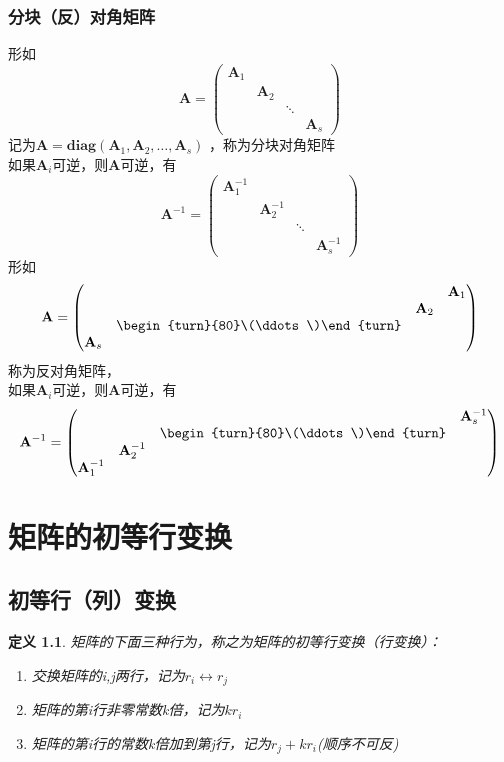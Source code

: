 \documentclass[12pt,oneside]{ctexbook}
\newtheorem{definition}[subsection]{定义}
\begin{document}
\subsection{分块（反）对角矩阵}
形如\[\mathbf{A}=\begin{pmatrix}
    \mathbf{A}_1&
    \\ &\mathbf{A}_2
    \\ &&\ddots
    \\ &&&\mathbf{A}_s
\end{pmatrix}\]
记为\(\mathbf{A}= \mathbf{diag}(\mathbf{A}_{1},\mathbf{A}_{2},\dots ,\mathbf{A}_{s})\)
，称为分块对角矩阵
\\如果\(\mathbf{A}_{i}\)可逆，则\(\mathbf{A}\)可逆，有\[\mathbf{A}^{-1}=\begin{pmatrix}
    \mathbf{A}^{-1}_1&
    \\ &\mathbf{A}^{-1}_2
    \\ &&\ddots
    \\ &&&\mathbf{A}^{-1}_s
\end{pmatrix}\]
形如\[\mathbf{A}=\begin{pmatrix}
    &&&\mathbf{A}_1
    \\ &&\mathbf{A}_2
    \\ &\begin{turn}{80}\(\ddots\)\end{turn}
    \\ \mathbf{A}_s
\end{pmatrix}\]
称为反对角矩阵，
\\如果\(\mathbf{A}_{i}\)可逆，则\(\mathbf{A}\)可逆，有
\[\mathbf{A}^{-1}=\begin{pmatrix}
    &&&\mathbf{A}^{-1}_s
    \\ &&\begin{turn}{80}\(\ddots\)\end{turn}
    \\ &\mathbf{A}^{-1}_2
    \\ \mathbf{A}^{-1}_1
\end{pmatrix}\]


\chapter{矩阵的初等行变换}
\section{初等行（列）变换}
\begin{definition}
    \kaishu 矩阵的下面三种行为，称之为矩阵的初等行变换（行变换）：
\begin{enumerate}
    \item 交换矩阵的i,j两行，记为\(r_i \leftrightarrow r_j \)
    \item 矩阵的第i行非零常数k倍，记为\(kr_i\)
    \item 矩阵的第i行的常数k倍加到第j行，记为\(r_j+kr_i\)(顺序不可反)
\end{enumerate}
\end{definition}
\end{document}
